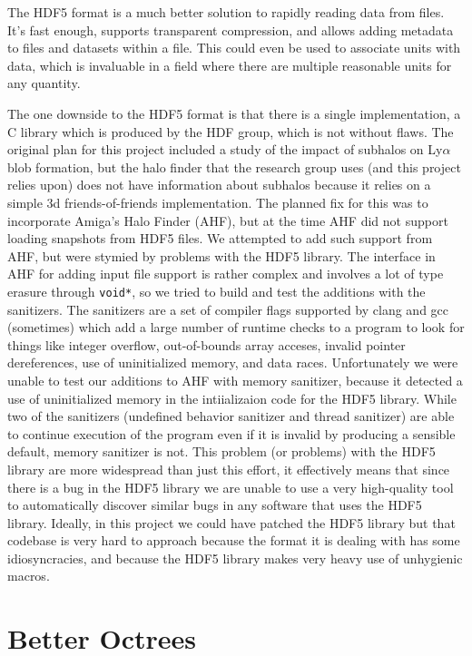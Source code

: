 The HDF5 format is a much better solution to rapidly reading data from files.
It's fast enough, supports transparent compression, and allows adding metadata to files and datasets within a file.
This could even be used to associate units with data, which is invaluable in a field where there are multiple reasonable units for any quantity.

The one downside to the HDF5 format is that there is a single implementation, a C library which is produced by the HDF group, which is not without flaws.
The original plan for this project included a study of the impact of subhalos on Ly$\alpha$ blob formation, but the halo finder that the research group uses (and this project relies upon) does not have information about subhalos because it relies on a simple 3d friends-of-friends implementation.
The planned fix for this was to incorporate Amiga's Halo Finder (AHF), but at the time AHF did not support loading snapshots from HDF5 files.
We attempted to add such support from AHF, but were stymied by problems with the HDF5 library.
The interface in AHF for adding input file support is rather complex and involves a lot of type erasure through \lstinline{void*}, so we tried to build and test the additions with the sanitizers.
The sanitizers are a set of compiler flags supported by clang and gcc (sometimes) which add a large number of runtime checks to a program to look for things like integer overflow, out-of-bounds array acceses, invalid pointer dereferences, use of uninitialized memory, and data races.
Unfortunately we were unable to test our additions to AHF with memory sanitizer, because it detected a use of uninitialized memory in the intiializaion code for the HDF5 library.
While two of the sanitizers (undefined behavior sanitizer and thread sanitizer) are able to continue execution of the program even if it is invalid by producing a sensible default, memory sanitizer is not.
This problem (or problems) with the HDF5 library are more widespread than just this effort, it effectively means that since there is a bug in the HDF5 library we are unable to use a very high-quality tool to automatically discover similar bugs in any software that uses the HDF5 library.
Ideally, in this project we could have patched the HDF5 library but that codebase is very hard to approach because the format it is dealing with has some idiosyncracies, and because the HDF5 library makes very heavy use of unhygienic macros.

\section{Better Octrees}

